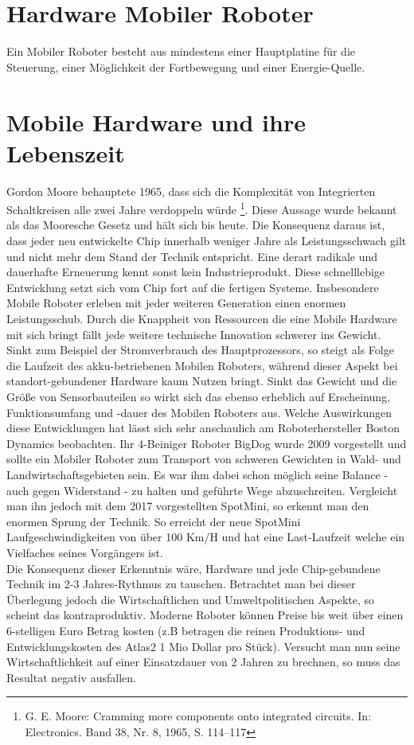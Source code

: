 \documentclass[a4paper,cleardoubleempty,BCOR1cm]{book}
\begin{document}
\section{Hardware Mobiler Roboter}
Ein Mobiler Roboter besteht aus mindestens einer Hauptplatine für die Steuerung, einer Möglichkeit der Fortbewegung und einer Energie-Quelle. \\


\section{Mobile Hardware und ihre Lebenszeit}
Gordon Moore behauptete 1965, dass sich die Komplexität von Integrierten Schaltkreisen alle zwei Jahre verdoppeln würde \footnote{ G. E. Moore: Cramming more components onto integrated circuits. In: Electronics. Band 38, Nr. 8, 1965, S. 114–117}. Diese Aussage wurde bekannt als das Mooresche Gesetz und hält sich bis heute. Die Konsequenz daraus ist, dass jeder neu entwickelte Chip innerhalb weniger Jahre als Leistungsschwach gilt und nicht mehr dem Stand der Technik entspricht. Eine derart radikale und dauerhafte Erneuerung kennt sonst kein Industrieprodukt. Diese schnelllebige Entwicklung setzt sich vom Chip fort auf die fertigen Systeme. Insbesondere Mobile Roboter erleben mit jeder weiteren Generation einen enormen Leistungsschub. Durch die Knappheit von Ressourcen die eine Mobile Hardware mit sich bringt fällt jede weitere technische Innovation schwerer ins Gewicht. Sinkt zum Beispiel der Stromverbrauch des Hauptprozessors, so steigt als Folge die Laufzeit des akku-betriebenen Mobilen Roboters, während dieser Aspekt bei standort-gebundener Hardware kaum Nutzen bringt. Sinkt das Gewicht und die Größe von Sensorbauteilen so wirkt sich das ebenso erheblich auf Erscheinung, Funktionsumfang und -dauer des Mobilen Roboters aus. Welche Auswirkungen diese Entwicklungen hat lässt sich sehr anschaulich am Roboterhersteller Boston Dynamics beobachten. Ihr 4-Beiniger Roboter BigDog wurde 2009 vorgestellt und sollte ein Mobiler Roboter zum Transport von schweren Gewichten in Wald- und Landwirtschaftsgebieten sein. Es war ihm dabei schon möglich seine Balance - auch gegen Widerstand - zu halten und geführte Wege abzuschreiten. Vergleicht man ihn jedoch mit dem 2017 vorgestellten SpotMini, so erkennt man den enormen Sprung der Technik. So erreicht der neue SpotMini Laufgeschwindigkeiten von über 100 Km/H und hat eine Last-Laufzeit welche ein Vielfaches seines Vorgängers ist. \\
Die Konsequenz dieser Erkenntnis wäre, Hardware und jede Chip-gebundene Technik im 2-3 Jahres-Rythmus zu tauschen. Betrachtet man bei dieser Überlegung jedoch die Wirtschaftlichen und Umweltpolitischen Aspekte, so scheint das kontraproduktiv. Moderne Roboter können Preise bis weit über einen 6-stelligen Euro Betrag kosten (z.B betragen die reinen Produktions- und Entwicklungskosten des Atlas2 1 Mio Dollar pro Stück). Versucht man nun seine Wirtschaftlichkeit auf einer Einsatzdauer von 2 Jahren zu brechnen, so muss das Resultat negativ ausfallen. \\
\end{document}
